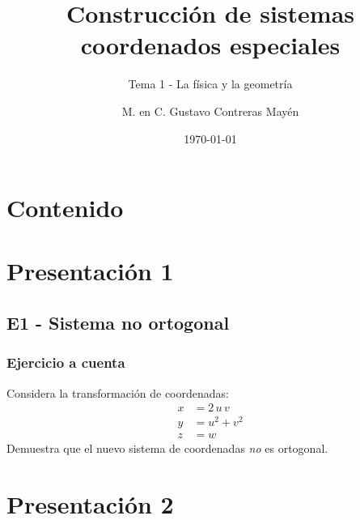 
\title{\large{Construcción de sistemas coordenados especiales}}
\subtitle{Tema 1 - La física y la geometría}
\author{M. en C. Gustavo Contreras Mayén}
\date{\today}

\maketitle
\fontsize{14}{14}\selectfont
{}
\section*{Contenido}
\section{Presentación 1}
\subsection{E1 - Sistema no ortogonal}
\begin{frame}
\frametitle{Ejercicio a cuenta}
Considera la transformación de coordenadas:
\begin{align*}
x &= 2 \, u \, v \\[0.5em]
y &= u^{2} + v^{2} \\[0.5em]
z &= w
\end{align*}
Demuestra que el nuevo sistema de coordenadas \emph{no} es ortogonal.
\end{frame}
\section{Presentación 2}
